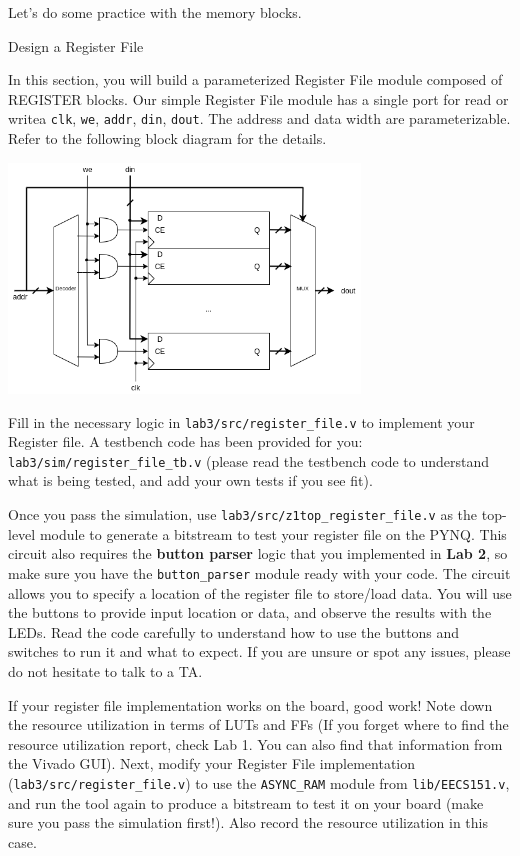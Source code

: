 \documentclass[11pt]{article}
\makeatletter
\renewcommand{\subsection}
{\@startsection {subsection}{1}{0pt}
 {-1ex}
 {0.5ex}
 {\bfseries\normalsize}}
\makeatother
\begin{document}
{Let's do some practice with the memory blocks.

\subsection{Design a Register File}

In this section, you will build a parameterized Register File module composed of REGISTER blocks. Our simple Register File module has a single port for read or writea {\texttt{clk}, \texttt{we}, \texttt{addr}, \texttt{din}, \texttt{dout}}. The address and data width are parameterizable. Refer to the following block diagram for the details.

\begin{center}
\includegraphics[width=0.7\textwidth]{figs/regfile.png}
\end{center}

Fill in the necessary logic in \verb|lab3/src/register_file.v| to implement your Register file. A testbench code has been provided for you: \verb|lab3/sim/register_file_tb.v| (please read the testbench code to understand what is being tested, and add your own tests if you see fit).

Once you pass the simulation, use \verb|lab3/src/z1top_register_file.v| as the top-level module to generate a bitstream to test your register file on the PYNQ. This circuit also requires the \textbf{button parser} logic that you implemented in \textbf{Lab 2}, so make sure you have the \verb|button_parser| module ready with your code. The circuit allows you to specify a location of the register file to store/load data. You will use the buttons to provide input location or data, and observe the results with the LEDs. Read the code carefully to understand how to use the buttons and switches to run it and what to expect. If you are unsure or spot any issues, please do not hesitate to talk to a TA.

If your register file implementation works on the board, good work! Note down the resource utilization in terms of LUTs and FFs (If you forget where to find the resource utilization report, check Lab 1. You can also find that information from the Vivado GUI). Next, modify your Register File implementation (\verb|lab3/src/register_file.v|) to use the \texttt{ASYNC\_RAM} module from \verb|lib/EECS151.v|, and run the tool again to produce a bitstream to test it on your board (make sure you pass the simulation first!). Also record the resource utilization in this case.

}
\end{document}
